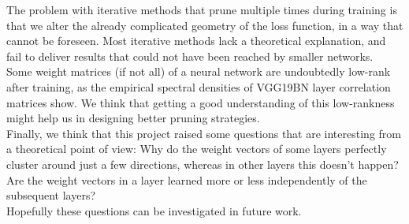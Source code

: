 The problem with iterative methods that prune multiple times during training is that we alter the already complicated geometry of the loss function, in a way that cannot be foreseen. Most iterative methods lack a theoretical explanation, and fail to deliver results that could not have been reached by smaller networks. \\ 

Some weight matrices (if not all) of a neural network are undoubtedly low-rank after training, as the empirical spectral densities of VGG19BN layer correlation matrices show. We think that getting a good understanding of this low-rankness might help us in designing better pruning strategies. \\

Finally, we think that this project raised some questions that are interesting from a theoretical point of view: Why do the weight vectors of some layers perfectly cluster around just a few directions, whereas in other layers this doesn't happen? Are the weight vectors in a layer learned more or less independently of the subsequent layers? \\

Hopefully these questions can be investigated in future work.

\nocite{*}
\printbibliography


